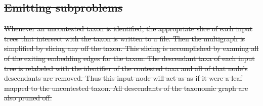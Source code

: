 \documentclass[fleqn,12pt,lineno,english]{wlpeerj}
\providecommand{\DIFdeltex}[1]{{\protect\color{red}\sout{#1}}}                      %
\providecommand{\DIFdelend}{} %
\providecommand{\DIFdel}[1]{\texorpdfstring{\DIFdeltex{#1}}{}} %
\begin{document}
\subsection{\DIFdel{Emitting subproblems}}
\addtocounter{subsection}{-1}%

\DIFdel{Whenever an uncontested taxon is identified, the appropriate slice
of each input trees that intersect with the taxon is written to a
file. Then the multigraph is simplified by slicing any off the taxon.
This slicing is accomplished by examing all of the exiting embedding
edges for the taxon. The descendant taxa of each input tree is relabeled
with the identifier of the contested taxa and all of that node's descendants
are removed. Thus this input node will act as as if it were a leaf
mapped to the uncontested taxon. All descendants of the taxonomic
graph are also pruned off.
 }\DIFdelend
\end{document}
